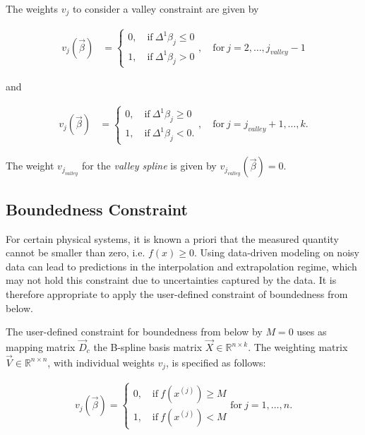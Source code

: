 \documentclass[10pt,a4paper]{report}
\begin{document}
The weights $v_j$ to consider a valley constraint are given by

\begin{align}\label{eq:v_valley_1}
	v_j(\vec{\beta}) &= \begin{cases} 
		0, \quad \text{if} \ \Delta^1\beta_j \le 0 \\ 
		1, \quad \text{if} \ \Delta^1\beta_j > 0
	\end{cases}, \quad \text{for} \ j=2, \dots, j_{valley}-1
\end{align}

and 

\begin{align}\label{eq:v_valley_2}
	v_j(\vec{\beta}) &= \begin{cases} 
		0, \quad \text{if} \ \Delta^1\beta_j \ge 0 \\ 
		1, \quad \text{if} \ \Delta^1\beta_j < 0.
	\end{cases}, \quad \text{for} \  j=j_{valley}+1, \dots, k.
\end{align}

The weight $v_{j_{valley}}$ for the \emph{valley spline} is given by $v_{j_{valley}}(\vec{\beta}) = 0$.

\subsection{Boundedness Constraint}

For certain physical systems, it is known a priori that the measured quantity cannot be smaller than zero, i.e. $f(x) \ge 0$. Using data-driven modeling on noisy data can lead to predictions in the interpolation and extrapolation regime, which may not hold this constraint due to uncertainties captured by the data. It is therefore appropriate to apply the user-defined constraint of boundedness from below.

The user-defined constraint for boundedness from below by $M=0$ uses as mapping matrix $\vec{D}_c$ the B-spline basis matrix $\vec{X} \in \mathbb{R}^{n \times k}$. The weighting matrix $\vec{V} \in \mathbb{R}^{n\times n}$, with individual weights $v_j$, is specified as follows:

\begin{align} \label{eq:v_boundedness}
	v_j(\vec{\beta}) = \begin{cases} 
		0, \quad \text{if} \ f(x^{(j)}) \ge M\\ 
		1, \quad \text{if} \ f(x^{(j)})  < M 		
	\end{cases} \text{for} \ j=1, \dots, n.
\end{align}
\end{document}
